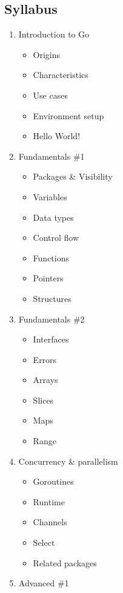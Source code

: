 \documentclass[
  digital,
  color,
  oneside,
  nosansbold,
  nocolorbold,
  lof,
  lot,
]{fithesis4}
\begin{document}
\subsection{Syllabus}

\begin{enumerate}
    \item Introduction to Go
    \begin{itemize}
        \item Origins
        \item Characteristics
        \item Use cases
        \item Environment setup
        \item Hello World!
    \end{itemize}
    \item Fundamentals \#1
    \begin{itemize}
        \item Packages \& Visibility
        \item Variables
        \item Data types
        \item Control flow
        \item Functions
        \item Pointers
        \item Structures
    \end{itemize}
    \item Fundamentals \#2
    \begin{itemize}
        \item Interfaces
        \item Errors
        \item Arrays
        \item Slices
        \item Maps
        \item Range
    \end{itemize}
    \item Concurrency \& parallelism
    \begin{itemize}
        \item Goroutines
        \item Runtime
        \item Channels
        \item Select
        \item Related packages
    \end{itemize}
    \item Advanced \#1
    \begin{itemize}

\end{itemize}
\end{enumerate}
\end{document}
